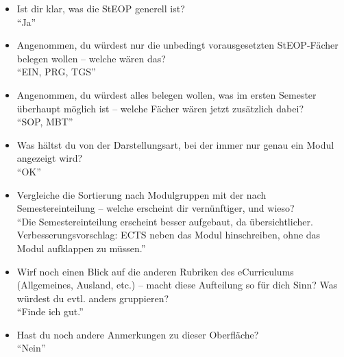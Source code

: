 \documentclass[a4paper,10pt]{scrartcl}
\begin{document}
\begin{itemize}

\item Ist dir klar, was die StEOP generell ist? \\

``Ja''\\

\item Angenommen, du würdest nur die unbedingt vorausgesetzten StEOP-Fächer belegen wollen – welche wären das? \\

``EIN, PRG, TGS''\\

\item Angenommen, du würdest alles belegen wollen, was im ersten Semester überhaupt möglich ist – welche Fächer wären jetzt zusätzlich dabei? \\

``SOP, MBT''\\


\item Was hältst du von der Darstellungsart, bei der immer nur genau ein Modul 
angezeigt wird? \\

``OK''\\

\item Vergleiche die Sortierung nach Modulgruppen mit der nach Semestereinteilung
– welche erscheint dir vernünftiger, und wieso? \\

``Die Semestereinteilung erscheint besser aufgebaut, da übersichtlicher. Verbesserungsvorschlag: ECTS 
	neben das Modul hinschreiben, ohne das Modul aufklappen zu müssen.''\\

\item Wirf noch einen Blick auf die anderen Rubriken des eCurriculums (Allgemeines,
Ausland, etc.) – macht diese Aufteilung so für dich Sinn? Was würdest du evtl.
anders gruppieren? \\

``Finde ich gut.''\\

\item Hast du noch andere Anmerkungen zu dieser Oberfläche? \\

``Nein''\\

\end{itemize}
\end{document}
